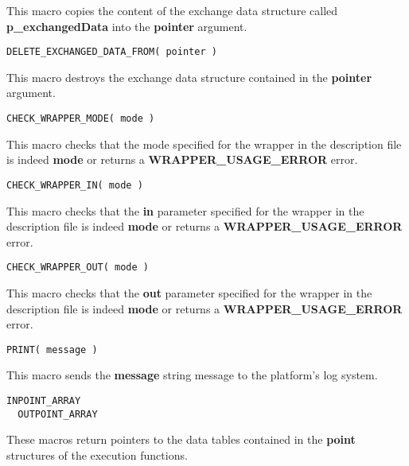 This macro copies the content of the exchange data structure called {\bf p\_exchangedData} into the {\bf pointer} argument.

\lstset{language=C++, basicstyle=\normalsize}
\begin{lstlisting}[frame=TRBL]
  DELETE_EXCHANGED_DATA_FROM( pointer )
\end{lstlisting}

This macro destroys the exchange data structure contained in the {\bf pointer} argument.

\lstset{language=C++, basicstyle=\normalsize}
\begin{lstlisting}[frame=TRBL]
  CHECK_WRAPPER_MODE( mode )
\end{lstlisting}

This macro checks that the mode specified for the wrapper in the description file is indeed {\bf mode} or returns a {\bf WRAPPER\_USAGE\_ERROR} error.

\lstset{language=C++, basicstyle=\normalsize}
\begin{lstlisting}[frame=TRBL]
  CHECK_WRAPPER_IN( mode )
\end{lstlisting}

This macro checks that the {\bf in} parameter specified for the wrapper in the description file is indeed {\bf mode} or returns a {\bf WRAPPER\_USAGE\_ERROR} error.

\lstset{language=C++, basicstyle=\normalsize}
\begin{lstlisting}[frame=TRBL]
  CHECK_WRAPPER_OUT( mode )
\end{lstlisting}

This macro checks that the {\bf out} parameter specified for the wrapper in the description file is indeed {\bf mode} or returns a {\bf WRAPPER\_USAGE\_ERROR} error.

\lstset{language=C++, basicstyle=\normalsize}
\begin{lstlisting}[frame=TRBL]
  PRINT( message )
\end{lstlisting}

This macro sends the {\bf message} string message to the platform's log system.

\lstset{language=C++, basicstyle=\normalsize}
\begin{lstlisting}[frame=TRBL]
  INPOINT_ARRAY
  OUTPOINT_ARRAY
\end{lstlisting}

These macros return pointers to the data tables contained in the {\bf point} structures of the execution functions.

